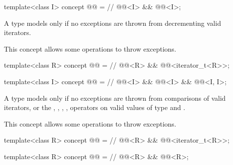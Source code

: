 \begin{itemdecl}
template<class I>
concept @@ = // \expos
  @@<I> &&
  @@<I>;
\end{itemdecl}

\begin{itemdescr}
\pnum
A type  models 
only if no exceptions are thrown from decrementing valid iterators.
\begin{note}
This concept allows some 
operations to throw exceptions.
\end{note}
\end{itemdescr}

\begin{itemdecl}
template<class R>
concept @@ = // \expos
  @@<R> &&
  @@<iterator_t<R>>;
\end{itemdecl}

\begin{itemdecl}
template<class I>
concept @@ = // \expos
  @@<I> &&
  @@<I> &&
  @@<I, I>;
\end{itemdecl}

\begin{itemdescr}
\pnum
A type  models 
only if no exceptions are thrown from comparisons of valid iterators,
or the \tcode{-}, \tcode{+}, \tcode{-=}, \tcode{+=}, \tcode{[]} operators
on valid values of type  and .
\begin{note}
This concept allows some 
operations to throw exceptions.
\end{note}
\end{itemdescr}

\begin{itemdecl}
template<class R>
concept @@ = // \expos
  @@<R> &&
  @@<iterator_t<R>>;

template<class R>
concept @@ = // \expos
  @@<R> && @@<R>;
\end{itemdecl}

